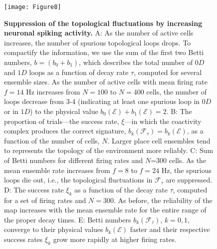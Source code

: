 \documentclass[12pt,tightenlines]{revtex4}
\begin{document}
\begin{figure}[!h]
\texttt{[image: Figure8]}
\caption{{\footnotesize\textbf{Suppression of the topological fluctuations by increasing neuronal spiking activity.} 
A: As the number of active cells increases, the number of spurious topological loops drops. To compactify the information, 
we use the sum of the first two Betti numbers, $b = (b_0 + b_1)$, which describes the total number of $0D$ and $1D$ loops 
as a function of decay rate $\tau$, computed for several ensemble sizes. As the number of active cells with mean firing rate 
$f = 14$ Hz increases from $N = 100$ to $N = 400$ cells, the number of loops decrease from 3-4 (indicating at least one 
spurious loop in $0D$ or in $1D$) to the physical value $b_0(\mathcal{E})+b_1(\mathcal{E}) = 2$. 
B: The proportion of trials---the success rate, $\xi$---in which the coactivity complex produces the correct signature, $b_k(\mathcal{F}_{\tau})=b_k(\mathcal{E})$, as a function of the number of cells, $N$. Larger place cell ensembles 
tend to represents the topology of the environment more reliably. 
C: Sum of Betti numbers for different firing rates and $N$=300 cells. As the mean ensemble rate increases from $f = 8$ to 
$f = 24$ Hz, the spurious loops die out, i.e., the topological fluctuations in $\mathcal{F}_{\tau}$ are suppressed. 
D: The success rate $\xi_k$ as a function of the decay rate $\tau$, computed for a set of firing rates and $N = 300$. As before, 
the reliability of the map increases with the mean ensemble rate for the entire range of the proper decay times.
E: Betti numbers $b_k(\mathcal{F}_{\tau})$, $k = 0,1$, converge to their physical values $b_k(\mathcal{E})$ faster and their 
respective success rates $\xi_k$ grow more rapidly at higher firing rates.}}
\label{Figure8}
\end{figure}
\end{document}
